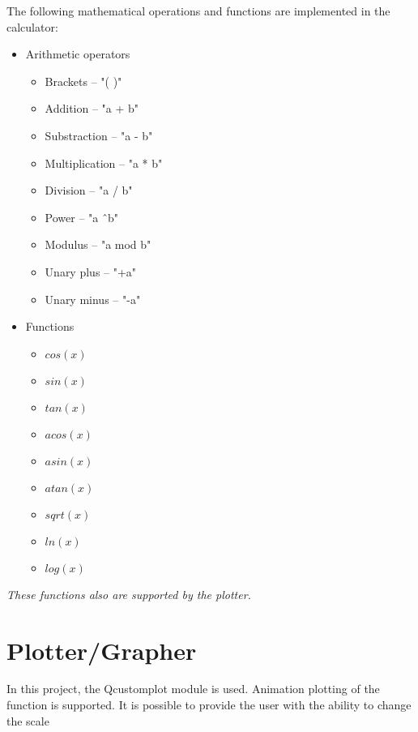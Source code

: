 \documentclass[14pt, a4paper]{article}
\begin{document}
The following mathematical operations and functions are implemented in the calculator:
  \begin{itemize}
    \item Arithmetic operators
    \begin{itemize}
      \item Brackets -- "( )"
      \item Addition -- "a + b"
      \item Substraction -- "a - b"
      \item Multiplication -- "a * b"
      \item Division -- "a / b"
      \item Power -- "a \^\ b"
      \item Modulus -- "a mod b"
      \item Unary plus -- "+a"
      \item Unary minus -- "-a"
    \end{itemize}
    \item Functions
    \begin{itemize}
      \item $cos(x)$
      \item $sin(x)$
      \item $tan(x)$
      \item $acos(x)$
      \item $asin(x)$
      \item $atan(x)$
      \item $sqrt(x)$
      \item $ln(x)$
      \item $log(x)$
    \end{itemize}
  \end{itemize}

\textit{These functions also are supported by the plotter.}

\pagebreak

\section{Plotter/Grapher}

In this project, the Qcustomplot module is used.
Animation plotting of the function is supported.
It is possible to provide the user with the ability to change the scale
\end{document}
